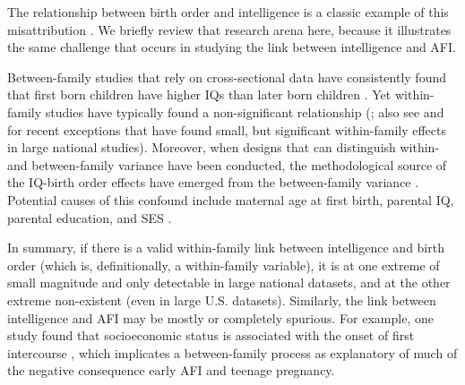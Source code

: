 The relationship between birth order and intelligence is a classic example of this misattribution \citep[See][]{damian2015associations,Rodgers2000,rodgers2014birth}. We briefly review that research arena here, because it illustrates the same challenge that occurs in studying the link between intelligence and AFI. 

Between-family studies that rely on cross-sectional data have consistently found that first born children have higher IQs than later born children \citep{belmont1973birth,zajonc1976family}. Yet within-family studies have typically found a non-significant relationship (\citealp{berbaum1980intellectual,galbraith1982sibling,retherford1991birth,Rodgers2000}; also see \citealp{barclay2015within} and \citealp{bjerkedal2007intelligence} for recent exceptions that have found small, but significant within-family effects in large national studies). Moreover, when designs that can distinguish within- and between-family variance have been conducted, the methodological source of the IQ-birth order effects have emerged from the between-family variance \citep{black2011older,rodgers1984confluence,Rodgers2000,Wichman2006,Wichman2007}. Potential causes of this confound include maternal age at first birth, parental IQ, parental education, and SES \citep[][also see \citep{Anastasi1956} for an insightful overview, written prior to the IQ-birth order debate.]{page1979family,Rodgers2001admixture,Rodgers2008AJS}.

In summary, if there is a valid within-family link between intelligence and birth order (which is, definitionally, a within-family variable), it is at one extreme of small magnitude and only detectable in large national datasets, and at the other extreme non-existent (even in large U.S. datasets). Similarly, the link between intelligence and AFI may be mostly or completely spurious. For example, one study found that socioeconomic status is associated with the onset of first intercourse \citep{Lammers2000}, which implicates a between-family process as explanatory of much of the negative consequence early AFI and teenage pregnancy.

